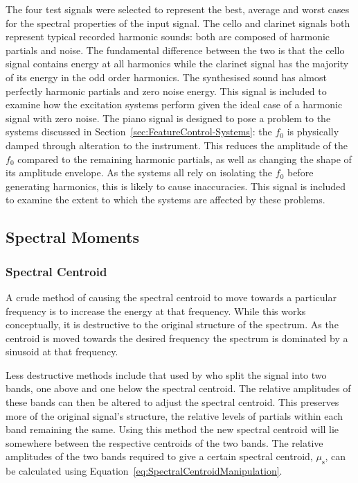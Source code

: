 	The four test signals were selected to represent the best, average and worst cases for the spectral properties of
	the input signal. The cello and clarinet signals both represent typical recorded harmonic sounds: both are composed
	of harmonic partials and noise. The fundamental difference between the two is that the cello signal contains energy
	at all harmonics while the clarinet signal has the majority of its energy in the odd order harmonics. The
	synthesised sound has almost perfectly harmonic partials and zero noise energy. This signal is included to examine
	how the excitation systems perform given the ideal case of a harmonic signal with zero noise. The piano signal is
	designed to pose a problem to the systems discussed in Section~\ref{sec:FeatureControl-Systems}: the $f_{0}$ is
	physically damped through alteration to the instrument. This reduces the amplitude of the $f_{0}$ compared to the
	remaining harmonic partials, as well as changing the shape of its amplitude envelope. As the systems all rely on
	isolating the $f_{0}$ before generating harmonics, this is likely to cause inaccuracies. This signal is included to
	examine the extent to which the systems are affected by these problems.

	\subsection{Spectral Moments}
	\label{sec:FeatureControl-Parameterisation-SpectralMoments}
		\subsubsection*{Spectral Centroid}
			A crude method of causing the spectral centroid to move towards a particular frequency is to
			increase the energy at that frequency. While this works conceptually, it is destructive to the
			original structure of the spectrum. As the centroid is moved towards the desired frequency the
			spectrum is dominated by a sinusoid at that frequency.

			Less destructive methods include that used by \citet{zacharakis2011an} who split the signal into
			two bands, one above and one below the spectral centroid. The relative amplitudes of these bands
			can then be altered to adjust the spectral centroid. This preserves more of the original signal's
			structure, the relative levels of partials within each band remaining the same. Using this method
			the new spectral centroid will lie somewhere between the respective centroids of the two bands. The
			relative amplitudes of the two bands required to give a certain spectral centroid,
			$\mu_{\mathrm{s}}$, can be calculated using Equation~\ref{eq:SpectralCentroidManipulation}.

